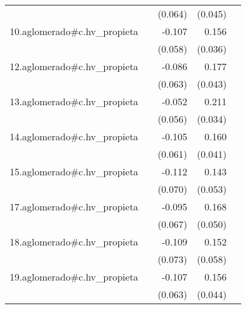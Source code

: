 {\begin{longtable}{l*{4}{D{.}{.}{-1}}}
            &                     &     (0.064)         &     (0.045)         &                     \\
\addlinespace
10.aglomerado#c.hv\_propieta&                     &      -0.107         &       0.156\sym{***}&                     \\
            &                     &     (0.058)         &     (0.036)         &                     \\
\addlinespace
12.aglomerado#c.hv\_propieta&                     &      -0.086         &       0.177\sym{***}&                     \\
            &                     &     (0.063)         &     (0.043)         &                     \\
\addlinespace
13.aglomerado#c.hv\_propieta&                     &      -0.052         &       0.211\sym{***}&                     \\
            &                     &     (0.056)         &     (0.034)         &                     \\
\addlinespace
14.aglomerado#c.hv\_propieta&                     &      -0.105         &       0.160\sym{***}&                     \\
            &                     &     (0.061)         &     (0.041)         &                     \\
\addlinespace
15.aglomerado#c.hv\_propieta&                     &      -0.112         &       0.143\sym{**} &                     \\
            &                     &     (0.070)         &     (0.053)         &                     \\
\addlinespace
17.aglomerado#c.hv\_propieta&                     &      -0.095         &       0.168\sym{***}&                     \\
            &                     &     (0.067)         &     (0.050)         &                     \\
\addlinespace
18.aglomerado#c.hv\_propieta&                     &      -0.109         &       0.152\sym{**} &                     \\
            &                     &     (0.073)         &     (0.058)         &                     \\
\addlinespace
19.aglomerado#c.hv\_propieta&                     &      -0.107         &       0.156\sym{***}&                     \\
            &                     &     (0.063)         &     (0.044)         &                     \\

\end{longtable}}
